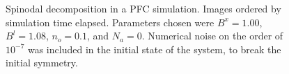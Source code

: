 \begin{figure}[h]
    \centering
{}
    \caption{Spinodal decomposition in a PFC simulation. Images ordered by simulation time elapsed. Parameters chosen were $B^x=1.00$, $B^l=1.08$, $n_o=0.1$, and $N_a=0$. Numerical noise on the order of $10^{-7}$ was included in the initial state of the system, to break the initial symmetry. }\label{fig:pfc_example_spinodal}
\end{figure}

